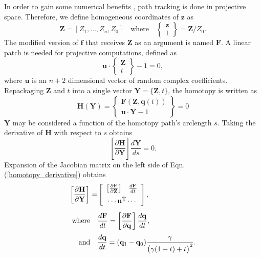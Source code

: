 \documentclass[journal]{IEEEtran}
\begin{document}
In order to gain some numerical benefits \cite{morganHomotopySolvingGeneral1987}, path tracking is done in projective space.
Therefore, we define homogeneous coordinates of $\mathbf{z}$ as
\begin{equation}
\mathbf{Z} = [ Z_1, \ldots, Z_n, Z_0 ] \quad \text{where} \quad 
\begin{Bmatrix} \mathbf{z} \\ 1 \end{Bmatrix} = \mathbf{Z}/Z_0.
\end{equation}
The modified version of $\mathbf{f}$ that receives $\mathbf{Z}$ as an argument is named $\mathbf{F}$.
A linear patch is needed for projective computations, defined as
\begin{equation}
\mathbf{u} \cdot \begin{Bmatrix} \mathbf{Z} \\ t \end{Bmatrix}  - 1 = 0,
\label{patch}
\end{equation}
where $\mathbf{u}$ is an $n+2$ dimensional vector of random complex coefficients.
Repackaging $\mathbf{Z}$ and $t$ into a single vector $\mathbf{Y} = \{ \mathbf{Z}, t \}$, the homotopy is written as
\begin{equation}
\mathbf{H}(\mathbf{Y}) = 
\begin{Bmatrix} 
\mathbf{F}(\mathbf{Z}, \mathbf{q}(t)) \\ 
\mathbf{u}\cdot\mathbf{Y} -1
\end{Bmatrix}= 0 \label{homotopy_projected}
\end{equation}
$\mathbf{Y}$ may be considered a function of the homotopy path's arclength $s$. Taking the derivative of $\mathbf{H}$ with respect to $s$ obtains
\begin{equation}
\left[ \frac{\partial \mathbf{H}}{\partial \mathbf{Y}} \right] \frac{d\mathbf{Y}}{ds} = 0. \label{homotopy_derivative}
\end{equation}
Expansion of the Jacobian matrix on the left side of Eqn. (\ref{homotopy_derivative}) obtains
\begin{align}
\left[ \frac{\partial \mathbf{H}}{\partial \mathbf{Y}} \right] = 
&\left[\begin{array}{cc}
\left[ \frac{\partial \mathbf{F}}{\partial \mathbf{Z}} \right] & 
\frac{d\mathbf{F}}{dt} \label{Jacobian_expansion}\\[2mm]
\multicolumn{2}{c}{\cdots\mathbf{u}^\text{T}\cdots}
\end{array} \right], \\[2mm]
\text{where} \quad &\frac{d\mathbf{F}}{dt} = \left[ \frac{\partial \mathbf{F}}{\partial \mathbf{q}} \right] \frac{d\mathbf{q}}{dt}, \nonumber\\[1mm]
\text{and} \quad &\frac{d\mathbf{q}}{dt} = (\mathbf{q}_1 - \mathbf{q}_0)\frac{\gamma}{\big( \gamma(1-t)+t \big)^2}. \nonumber
\end{align}
\end{document}
